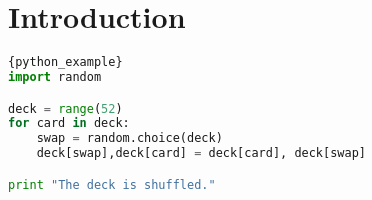 \section{Introduction}







\begin{lstlisting}[language=Python, caption=Python Example]{python_example}
import random

deck = range(52)
for card in deck:
    swap = random.choice(deck)
    deck[swap],deck[card] = deck[card], deck[swap]

print "The deck is shuffled."
\end{lstlisting}
